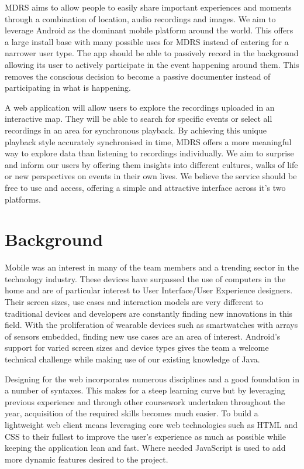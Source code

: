 \documentclass{l3proj}
\begin{document}
MDRS aims to allow people to easily share important experiences and moments through a combination of location, audio recordings and images. We aim to leverage Android as the dominant mobile platform around the world. This offers a large install base with many possible uses for MDRS instead of catering for a narrower user type. The app should be able to passively record in the background allowing its user to actively participate in the event happening around them. This removes the conscious decision to become a passive documenter instead of participating in what is happening.

A web application will allow users to explore the recordings uploaded in an interactive map. They will be able to search for specific events or select all recordings in an area for synchronous playback. By achieving this unique playback style accurately synchronised in time, MDRS offers a more meaningful way to explore data than listening to recordings individually. We aim to surprise and inform our users by offering them insights into different cultures, walks of life or new perspectives on events in their own lives. We believe the service should be free to use and access, offering a simple and attractive interface across it's two platforms.

\section{Background}
Mobile was an interest in many of the team members and a trending sector in the technology industry. These devices have surpassed the use of computers in the home and are of particular interest to User Interface/User Experience designers. Their screen sizes, use cases and interaction models are very different to traditional devices and developers are constantly finding new innovations in this field. With the proliferation of wearable devices such as smartwatches with arrays of sensors embedded, finding new use cases are an area of interest.  Android’s support for varied screen sizes and device types gives the team a welcome technical challenge while making use of our existing knowledge of Java.

Designing for the web incorporates numerous disciplines and a good foundation in a number of syntaxes. This makes for a steep learning curve but by leveraging previous experience and through other coursework undertaken throughout the year, acquisition of the required skills becomes much easier. To build a lightweight web client means leveraging core web technologies such as \gls{HTML} and \gls{CSS} to their fullest to improve the user’s experience as much as possible while keeping the application lean and fast. Where needed \gls{JavaScript} is used to add more dynamic features desired to the project.
\end{document}

